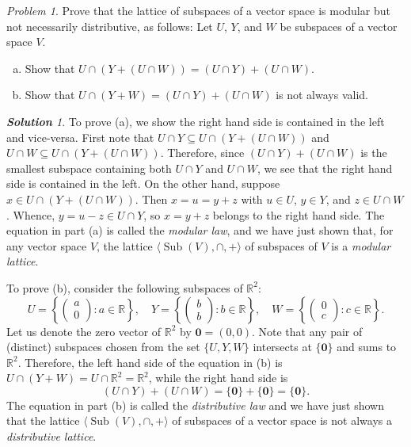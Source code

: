 \documentclass[11pt]{paper}
\theoremstyle{remark}
\newtheorem{problem}{Problem}
\newtheorem*{solution}{{\bf Solution}}
\newcommand\0{\ensuremath{\mathbf{0}}}
\newcommand{\<}{\ensuremath{\langle}}
\renewcommand{\>}{\ensuremath{\rangle}}
\newcommand\fld[1]{\ensuremath{\mathbb{#1}}}
\newcommand\R{\ensuremath{\fld{R}}}
\newcommand{\Sub}{\ensuremath{\operatorname{Sub}}}
\begin{document}
\probskip

\begin{problem}
Prove that the lattice of subspaces of a vector space
is modular but not necessarily distributive, as follows:
Let $U$, $Y$, and $W$ be subspaces of a vector space $V$. 
\begin{enumerate}[(a)]
\item Show that $U\cap (Y + (U \cap W)) = (U \cap Y) + (U \cap W)$.
\item Show that $U \cap (Y + W) = (U \cap Y) + (U \cap W)$ is not always valid.
\end{enumerate}
\end{problem}
\begin{solution}
To prove (a), we show the right hand side is contained in the left and
vice-versa.
First note that
$U \cap Y \subseteq U\cap (Y + (U \cap W))$ and 
$U \cap W \subseteq U\cap (Y + (U \cap W))$.
Therefore, since $(U \cap Y) + (U \cap W)$ is the smallest subspace containing both 
$U \cap Y$ and $U \cap W$, we see that the right hand side is contained in the left.
On the other hand, suppose $x \in U\cap (Y + (U \cap W))$.
Then $x = u = y + z$ with $u \in U$, $y\in Y$, and $z\in U \cap W$.
Whence, $y = u-z \in U \cap Y$, so $x = y+z$ belongs to the right hand side.
The equation in part (a) is called the \emph{modular law}, and we have
just shown that, for any vector space $V$, the lattice 
$\<\Sub(V), \cap, +\>$ of subspaces of
$V$ is a \emph{modular lattice}.

To prove (b), consider the following subspaces of $\R^2$:
\[
U = \left\{
\begin{pmatrix} a\\ 0 \end{pmatrix} : a\in \R \right\}, \quad 
Y = \left\{
\begin{pmatrix} b\\ b \end{pmatrix} : b\in \R \right\}, \quad 
W = \left\{
\begin{pmatrix} 0\\ c \end{pmatrix} : c\in \R \right\}.
\]
Let us denote the zero vector of $\R^2$ by 
$\0 = (0, 0)$.
Note that any pair of (distinct) subspaces chosen from the set
$\{U, Y, W\}$ intersects at $\{\0\}$ and sums to $\R^2$.
Therefore, the left hand side of the equation in (b) is
$U \cap (Y + W) = U \cap \R^2 = \R^2$, while the right hand side is 
\[
(U\cap Y) + (U\cap W) = \{\0\} + \{\0\}
= \{\0\}.
\]
The equation in part (b) is called the \emph{distributive law} and we have just shown
that the lattice $\<\Sub(V), \cap, +\>$ of subspaces of a vector space is not
always a \emph{distributive lattice}.

\end{solution}
\end{document}
